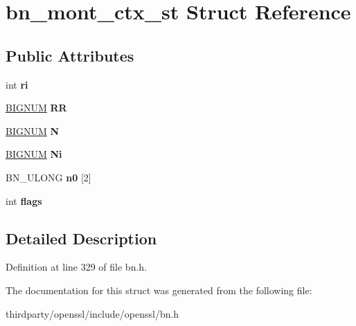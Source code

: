 \hypertarget{structbn__mont__ctx__st}{}\section{bn\+\_\+mont\+\_\+ctx\+\_\+st Struct Reference}
\label{structbn__mont__ctx__st}
\subsection*{Public Attributes}
\begin{DoxyCompactItemize}
\item 
\mbox{\label{structbn__mont__ctx__st_a62ed733165c48fa02734f7374b81dbe3}} 
int {\bfseries ri}
\item 
\mbox{\label{structbn__mont__ctx__st_a80618d14450f431dfbd94cf22f603dda}} 
\hyperlink{structbignum__st}{B\+I\+G\+N\+UM} {\bfseries RR}
\item 
\mbox{\label{structbn__mont__ctx__st_ab39e1c073bfde3c58c515d52f129e5fb}} 
\hyperlink{structbignum__st}{B\+I\+G\+N\+UM} {\bfseries N}
\item 
\mbox{\label{structbn__mont__ctx__st_addf9ef45809c717971be3b8b724db8cd}} 
\hyperlink{structbignum__st}{B\+I\+G\+N\+UM} {\bfseries Ni}
\item 
\mbox{\label{structbn__mont__ctx__st_a728405e4c4ef9cf589c09b42afe109e0}} 
B\+N\+\_\+\+U\+L\+O\+NG {\bfseries n0} \mbox{[}2\mbox{]}
\item 
\mbox{\label{structbn__mont__ctx__st_a8b43cc0971930aacb1fb2188e610dc8c}} 
int {\bfseries flags}
\end{DoxyCompactItemize}


\subsection{Detailed Description}


Definition at line 329 of file bn.\+h.



The documentation for this struct was generated from the following file\+:\begin{DoxyCompactItemize}
\item 
thirdparty/openssl/include/openssl/bn.\+h\end{DoxyCompactItemize}
